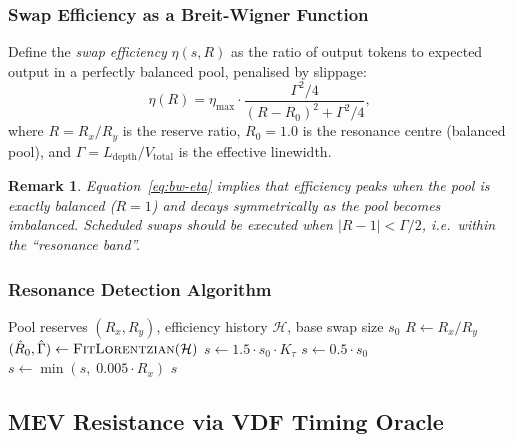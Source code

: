 \documentclass[12pt,a4paper]{article}
\newtheorem{remark}[theorem]{Remark}
\begin{document}
\subsubsection{Swap Efficiency as a Breit-Wigner Function}

Define the \emph{swap efficiency} $\eta(s, R)$ as the ratio of output tokens to
expected output in a perfectly balanced pool, penalised by slippage:
\begin{equation}
\eta(R) = \eta_\mathrm{max} \cdot \frac{\Gamma^2/4}{(R - R_0)^2 + \Gamma^2/4},
\label{eq:bw-eta}
\end{equation}
where $R = R_x/R_y$ is the reserve ratio, $R_0 = 1.0$ is the resonance
centre (balanced pool), and
$\Gamma = L_\mathrm{depth}/V_\mathrm{total}$ is the effective linewidth.

\begin{remark}
Equation~\eqref{eq:bw-eta} implies that efficiency peaks when the pool is
exactly balanced ($R = 1$) and decays symmetrically as the pool becomes
imbalanced.  Scheduled swaps should be executed when $|R - 1| < \Gamma/2$,
i.e.\ within the ``resonance band''.
\end{remark}

\subsubsection{Resonance Detection Algorithm}

\begin{algorithm}[ht]
\caption{Resonance-conditioned DCA execution}
\label{alg:resonance}
\begin{algorithmic}[1]
\Require Pool reserves $(R_x, R_y)$, efficiency history $\mathcal{H}$, base swap size $s_0$
\State $R \leftarrow R_x / R_y$
\State $(\hat{R}_0, \hat\Gamma) \leftarrow \textsc{FitLorentzian}(\mathcal{H})$ 
    \State $s \leftarrow 1.5 \cdot s_0 \cdot K_\tau$ 
\Else
    \State $s \leftarrow 0.5 \cdot s_0$ 
\EndIf
\State $s \leftarrow \min(s,\; 0.005 \cdot R_x)$ 
\State \Return $s$
\end{algorithmic}
\end{algorithm}

\subsection{MEV Resistance via VDF Timing Oracle}
\label{sec:mev}
\end{document}
